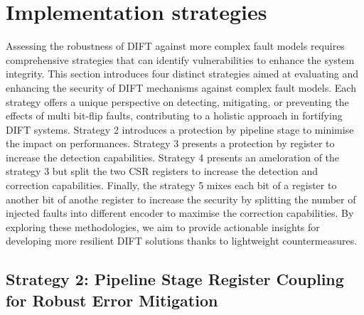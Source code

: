 \section{Implementation strategies}
\label{section:chap6_implem_strategies}

Assessing the robustness of DIFT against more complex fault models requires comprehensive strategies that can identify vulnerabilities to enhance the system integrity. This section introduces four distinct strategies aimed at evaluating and enhancing the security of DIFT mechanisms against complex fault models. Each strategy offers a unique perspective on detecting, mitigating, or preventing the effects of multi bit-flip faults, contributing to a holistic approach in fortifying DIFT systems.
Strategy 2 introduces a protection by pipeline stage to minimise the impact on performances. Strategy 3 presents a protection by register to increase the detection capabilities. Strategy 4 presents an ameloration of the strategy 3 but split the two CSR registers to increase the detection and correction capabilities. Finally, the strategy 5 mixes each bit of a register to another bit of anothe register to increase the security by splitting the number of injected faults into different encoder to maximise the correction capabilities.
By exploring these methodologies, we aim to provide actionable insights for developing more resilient DIFT solutions thanks to lightweight countermeasures.

\subsection{Strategy 2: Pipeline Stage Register Coupling for Robust Error Mitigation}

